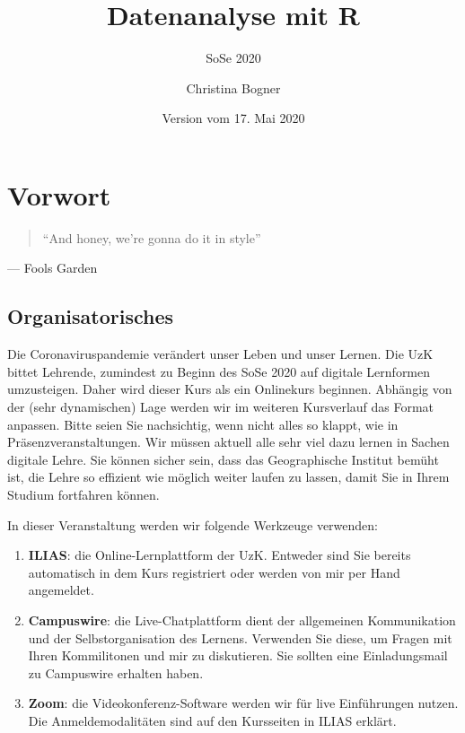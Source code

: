 \documentclass[]{book}
\title{Datenanalyse mit R}
\subtitle{SoSe 2020}
\author{Christina Bogner}
\date{Version vom 17. Mai 2020}
\providecommand{\tightlist}{%
  \setlength{\itemsep}{0pt}\setlength{\parskip}{0pt}}
\newenvironment{rmdinfo}{
  \definecolor{info}{rgb}{0.94, 0.97, 1.0}  %
  \color{black}
  \begin{mdframed}[backgroundcolor = info]}
 {\end{mdframed}}
\begin{document}
\maketitle

{
\setcounter{tocdepth}{1}
\tableofcontents
}
\hypertarget{vorwort}{%
\chapter{Vorwort}\label{vorwort}}

\begin{quote}
``And honey, we're gonna do it in style''
\end{quote}

\hfill --- Fools Garden

\hypertarget{organisatorisches}{%
\section{Organisatorisches}\label{organisatorisches}}

\begin{rmdinfo}
Die Coronaviruspandemie verändert unser Leben und unser Lernen. Die UzK
bittet Lehrende, zumindest zu Beginn des SoSe 2020 auf digitale
Lernformen umzusteigen. Daher wird dieser Kurs als ein Onlinekurs
beginnen. Abhängig von der (sehr dynamischen) Lage werden wir im
weiteren Kursverlauf das Format anpassen. Bitte seien Sie nachsichtig,
wenn nicht alles so klappt, wie in Präsenzveranstaltungen. Wir müssen
aktuell alle sehr viel dazu lernen in Sachen digitale Lehre. Sie können
sicher sein, dass das Geographische Institut bemüht ist, die Lehre so
effizient wie möglich weiter laufen zu lassen, damit Sie in Ihrem
Studium fortfahren können.
\end{rmdinfo}

In dieser Veranstaltung werden wir folgende Werkzeuge verwenden:

\begin{enumerate}
\def\labelenumi{\arabic{enumi}.}
\tightlist
\item
  \textbf{ILIAS}: die Online-Lernplattform der UzK. Entweder sind Sie bereits automatisch in dem Kurs registriert oder werden von mir per Hand angemeldet.
\item
  \textbf{Campuswire}: die Live-Chatplattform dient der allgemeinen Kommunikation und der Selbstorganisation des Lernens. Verwenden Sie diese, um Fragen mit Ihren Kommilitonen und mir zu diskutieren. Sie sollten eine Einladungsmail zu Campuswire erhalten haben.
\item
  \textbf{Zoom}: die Videokonferenz-Software werden wir für live Einführungen nutzen. Die Anmeldemodalitäten sind auf den Kursseiten in ILIAS erklärt.
\end{enumerate}
\end{document}
